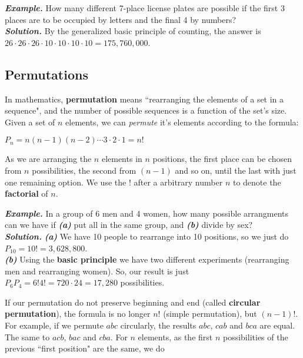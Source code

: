 \documentclass[a4paper,twocolumn]{article}
\begin{document}
\bigskip

\noindent\textbf{\textit{Example.}} How many different 7-place license plates are possible if the first 3 places are to be occupied by letters and the final 4 by numbers?\\
\noindent\textbf{\textit{Solution.}} By the generalized basic principle of counting, the answer is $26 \cdot 26 \cdot 26 \cdot 10 \cdot 10 \cdot 10 \cdot 10 = 175,760,000$.


\subsection{Permutations}
\label{subsec:permutations}

In mathematics, \textbf{permutation} means ``rearranging the elements of a set in a sequence", and the number of possible sequences is a function of the set's size. Given a set of $n$ elements, we can \textit{permute} it's elements according to the formula:

\begin{center}
$P_n = n(n - 1)(n - 2) \dotsm 3 \cdot 2 \cdot 1 = n!$
\end{center}

\noindent As we are arranging the $n$ elements in $n$ positions, the first place can be chosen from $n$ possibilities, the second from $(n - 1)$ and so on, until the last with just one remaining option. We use the $!$ after a arbitrary number $n$ to denote the \textbf{factorial} of $n$.

\bigskip

\noindent\textbf{\textit{Example.}} In a group of 6 men and 4 women, how many possible arrangments can we have if \textbf{\textit{(a)}} put all in the same group, and \textbf{\textit{(b)}} divide by sex?\\
\noindent\textbf{\textit{Solution.}} \textbf{\textit{(a)}} We have 10 people to rearrange into 10 positions, so we just do $P_{10} = 10! = 3,628,800$.\\
\textbf{\textit{(b)}} Using the \textbf{basic principle} we have two different experiments (rearranging men and rearranging women). So, our result is just $P_6 P_4 = 6!4! = 720 \cdot 24 = 17,280$ possibilities.

\bigskip

If our permutation do not preserve beginning and end (called \textbf{circular permutation}), the formula is no longer $n!$ (simple permutation), but $(n - 1)!$. For example, if we permute $abc$ circularly, the results $abc$, $cab$ and $bca$ are equal. The same to $acb$, $bac$ and $cba$. For $n$ elements, as the first $n$ possibilities of the previous ``first position" are the same, we do
\end{document}
